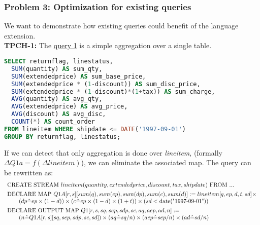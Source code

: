 \documentclass[11pt]{article}
\begin{document}
\subsubsection*{Problem 3: Optimization for existing queries}
We want to demonstrate how existing queries could benefit of the language extension.\\
\textbf{TPCH-1:} The \href{http://www.tpc.org/tpch/spec/tpch2.16.0.pdf}{query 1} is a simple aggregation over a single table.
\begin{lstlisting}[language=sql]
SELECT returnflag, linestatus, 
  SUM(quantity) AS sum_qty,
  SUM(extendedprice) AS sum_base_price,
  SUM(extendedprice * (1-discount)) AS sum_disc_price,
  SUM(extendedprice * (1-discount)*(1+tax)) AS sum_charge,
  AVG(quantity) AS avg_qty,
  AVG(extendedprice) AS avg_price,
  AVG(discount) AS avg_disc,
  COUNT(*) AS count_order
FROM lineitem WHERE shipdate <= DATE('1997-09-01')
GROUP BY returnflag, linestatus;
\end{lstlisting}
If we can detect that only aggregation is done over {\it lineitem}, (formally $\Delta Q1a=f(\Delta lineitem)$), we can eliminate the associated map. The query can be rewritten as:
\[\begin{array}{l}
\text{CREATE STREAM }lineitem(quantity,extendedprice,discount,tax,shipdate)\text{ FROM }...\vspace{4pt}\\
\text{DECLARE MAP }Q1A[r,s][sum(q),sum(ep),sum(dp),sum(c),sum(d)] := lineitem[q,ep,d,t,sd] \times\\
\qquad (dp \hat= ep\times(1-d)) \times (c \hat= ep\times(1-d)\times(1+t)) \times (sd < \text{date("1997-09-01")})\vspace{4pt}\\
\text{DECLARE OUTPUT MAP }Q1[r,s,sq,sep,sdp,sc,aq,aep,ad,n] := \\
	\qquad (n \hat= Q1A[r,s][sq,sep,sdp,sc,sd]) \times (aq \hat= sq/n) \times (aep \hat= sep/n) \times (ad \hat= sd/n)\vspace{4pt}\\
\end{array}\]
\end{document}
